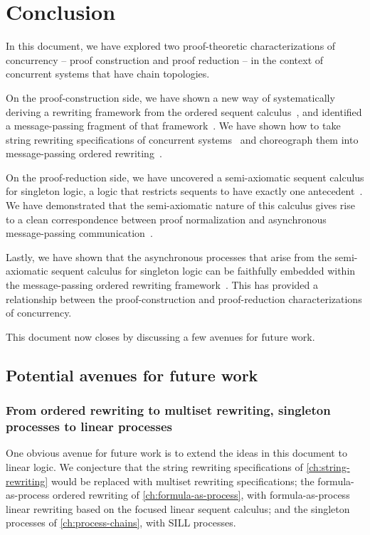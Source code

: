 \chapter{Conclusion}\label{ch:conclusion}

In this document, we have explored two proof-theoretic characterizations of concurrency -- proof construction and proof reduction -- in the context of concurrent systems that have chain topologies.

On the proof-construction side, we have shown a new way of systematically deriving a rewriting framework from the ordered sequent calculus~, and identified a message-passing fragment of that framework~.
We have shown how to take string rewriting specifications of concurrent systems~ and choreograph them into message-passing ordered rewriting~.

On the proof-reduction side, we have uncovered a semi-axiomatic sequent calculus for singleton logic, a logic that restricts sequents to have exactly one antecedent~.
We have demonstrated that the semi-axiomatic nature of this calculus gives rise to a clean correspondence between proof normalization and asynchronous message-passing communication~.

Lastly, we have shown that the asynchronous processes that arise from the semi-axiomatic sequent calculus for singleton logic can be faithfully embedded within the message-passing ordered rewriting framework~.
This has provided a relationship between the proof-construction and proof-reduction characterizations of concurrency.

This document now closes by discussing a few avenues for future work.

\section{Potential avenues for future work}\label{sec:conclusion:nondeterminism}

\subsection{From ordered rewriting to multiset rewriting, singleton processes to linear processes}

One obvious avenue for future work is to extend the ideas in this document to linear logic.
We conjecture that the string rewriting specifications of \cref{ch:string-rewriting} would be replaced with multiset rewriting specifications\autocite{Meseguer:TCS92}; the formula-as-process ordered rewriting of \cref{ch:formula-as-process}, with formula-as-process linear rewriting based on the focused linear sequent calculus\autocites{Miller:ELP92}{Cervesato+Scedrov:IC09}; and the singleton processes of \cref{ch:process-chains}, with \acs{SILL} processes\autocite{Caires+:MSCS16}.

